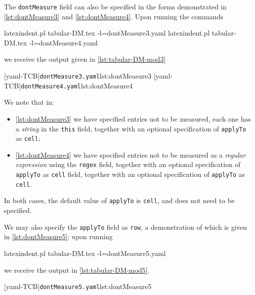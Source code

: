 \documentclass[10pt]{article}
\begin{document}
 \begin{example}
 The \texttt{dontMeasure} field can also be specified in the forms demonstrated in
 \cref{lst:dontMeasure3} and \cref{lst:dontMeasure4}. Upon running the commands

 \begin{commandshell} 
latexindent.pl tabular-DM.tex -l=dontMeasure3.yaml
latexindent.pl tabular-DM.tex -l=dontMeasure4.yaml
\end{commandshell}

 we receive the output given in \cref{lst:tabular-DM-mod3} 
 \begin{cmhtcbraster}[raster columns=3,
   raster left skip=-3.5cm,
   raster right skip=-2cm,
   raster column skip=.03\linewidth]
  [yaml-TCB]{\texttt{dontMeasure3.yaml}}{lst:dontMeasure3}
  [yaml-TCB]{\texttt{dontMeasure4.yaml}}{lst:dontMeasure4}
 \end{cmhtcbraster}
 We note that in:
 \begin{itemize}
  \item \cref{lst:dontMeasure3} we have specified entries not to be measured, each one has a
        \emph{string} in the \texttt{this}
        field, together with an optional specification of \texttt{applyTo} as \texttt{cell};
  \item \cref{lst:dontMeasure4} we have specified entries not to be measured as a
        \emph{regular expression} using
        the \texttt{regex} field, together with an optional specification of \texttt{applyTo} as
        \texttt{cell} field, together with an optional specification of \texttt{applyTo} as
        \texttt{cell}.
 \end{itemize}
 In both cases, the default value of \texttt{applyTo} is \texttt{cell}, and does not need
 to be specified.
 \end{example}

 \begin{example}
 We may also specify the \texttt{applyTo} field as \texttt{row}, a demonstration of which
 is given in \cref{lst:dontMeasure5}; upon running 

 \begin{commandshell} 
latexindent.pl tabular-DM.tex -l=dontMeasure5.yaml
\end{commandshell}

 we receive the output in \cref{lst:tabular-DM-mod5}.
 \begin{cmhtcbraster}
  [yaml-TCB]{\texttt{dontMeasure5.yaml}}{lst:dontMeasure5}
 \end{cmhtcbraster}
 \end{example}
\end{document}
